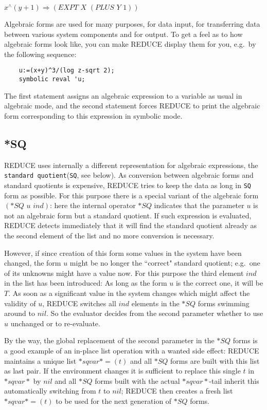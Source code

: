 \documentclass[11pt]{article}
\newcommand{\reduce}{\small REDUCE}
\begin{document}
$x^\wedge (y+1) \Rightarrow (EXPT\,\, X\,\, (PLUS\,\, Y\,\, 1))$

Algebraic forms are used for many purposes, for data input,
for transferring data between various system components and
for output. To get a feel as to how algebraic forms look
like, you can make {\reduce} display them for you, e.g.\  
by the following sequence:

\begin{verbatim}
    u:=(x+y)^3/(log z-sqrt 2);
    symbolic reval 'u;
\end{verbatim}

The first statement assigns an algebraic expression to a
variable as usual in algebraic mode, and the second statement
forces {\reduce} to print the algebraic form corresponding
to this expression in symbolic mode.


\subsection{*SQ}

{\reduce} uses internally a different
representation for algebraic expressions, the
{\tt standard quotient}({\tt SQ},
see below). As conversion
between algebraic forms and standard quotients is expensive,
{\reduce} tries to keep the data as long in {\tt SQ} 
form as possible. For this purpose there is a special
variant of the algebraic form $(*SQ \,\,  u \,\, ind)$: here the
internal operator $*SQ$ indicates that the parameter $u$
is not an algebraic form but a standard quotient. If such
expression is evaluated, {\reduce} detects
immediately that it will find the standard quotient
already as the second element of the list and no more
conversion is necessary. 

However, if since creation of this
form some values in the system have been changed, the
form $u$ might be no longer the ``correct" standard
quotient; e.g.\  one of its unknowns might have a value
now. For this purpose the third element $ind$ in the list
has been introduced: As long as the form $u$ is the correct
one, it will be $T$. As soon as a significant value in the
system changes which might affect the validity of $u$,
{\reduce} switches all $ind$ elements in the $*SQ$ forms
swimming around to $nil$. So the evaluator decides from the
second parameter whether to use $u$ unchanged or 
to re-evaluate.

By the way, the global replacement of the second parameter
in the $*SQ$ forms is a good example of an in-place
list operation with a wanted side effect:
{\reduce} maintains a unique  list $*sqvar*=(t)$ and all
$*SQ$ forms are built with this list as last pair.
If the environment changes it is sufficient to replace
this single {\bf $t$} in $*sqvar*$ by $nil$ and all $*SQ$ forms 
built with the actual $*sqvar*$-tail inherit this
automatically switching from $t$ to $nil$; 
{\reduce} then creates a fresh list $*sqvar*=(t)$
to be used for the next generation of $*SQ$ forms.
\end{document}
